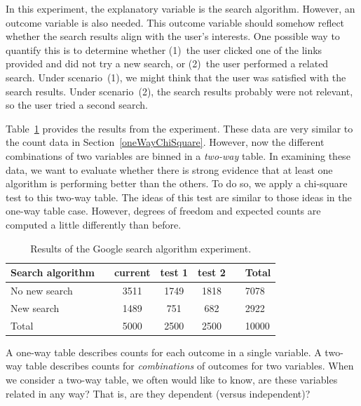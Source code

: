 In this experiment, the explanatory variable is the search algorithm. However, an outcome variable is also needed. This outcome variable should somehow reflect whether the search results align with the user's interests. One possible way to quantify this is to determine whether (1)~the user clicked one of the links provided and did not try a new search, or (2)~the user performed a related search. Under scenario~(1), we might think that the user was satisfied with the search results. Under scenario~(2), the search results probably were not relevant, so the user tried a second search.

Table~\ref{googleSearchAlgorithmByAlgorithmAndPerformanceWithTotals} provides the results from the experiment. These data are very similar to the count data in Section~\ref{oneWayChiSquare}. However, now the different combinations of two variables are binned in a \emph{two-way} table. In examining these data, we want to evaluate whether there is strong evidence that at least one algorithm is performing better than the others. To do so, we apply a chi-square test to this two-way table. The ideas of this test are similar to those ideas in the one-way table case. However, degrees of freedom and expected counts are computed a little differently than before.

\begin{table}[h]
\centering
\begin{tabular}{ll ccc ll}
\hline
Search algorithm & \hspace{1mm} & current & test 1 & test 2 & \hspace{1mm} & Total \\
\hline
No new search				   & & 3511    & 1749 & 1818 & 				& 7078 \\
New search				   & & 1489    & 751	& 682    &				& 2922 \\
\hline
Total						   & & 5000    & 2500 & 2500 & 				& 10000 \\
\hline
\end{tabular}
\caption{Results of the Google search algorithm experiment.}
\label{googleSearchAlgorithmByAlgorithmAndPerformanceWithTotals}
\end{table}

\begin{tipBox}{
A one-way table describes counts for each outcome in a single variable. A two-way table describes counts for \emph{combinations} of outcomes for two variables. When we consider a two-way table, we often would like to know, are these variables related in any way? That is, are they dependent (versus independent)?}
\end{tipBox}

